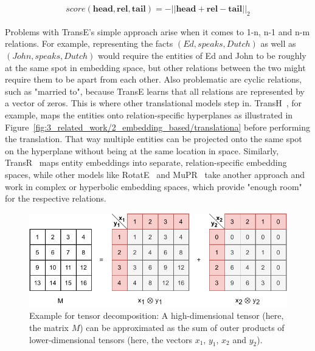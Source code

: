 \begin{align}
    score(\textbf{head}, \textbf{rel}, \textbf{tail}) = {- || \textbf{head} + \textbf{rel} - \textbf{tail} ||}_{2}
    \label{eq:3_related_work/2_embedding_based/trans_e}
\end{align}

Problems with TransE's simple approach arise when it comes to 1-n, n-1 and n-m relations. For example, representing the facts $(Ed, speaks, Dutch)$ as well as $(John, speaks, Dutch)$ would require the entities of Ed and John to be roughly at the same spot in embedding space, but other relations between the two might require them to be apart from each other. Also problematic are cyclic relations, such as "married to", because TransE learns that all relations are represented by a vector of zeros. This is where other translational models step in. TransH~\cite{Wang2014KnowledgeGE}, for example, maps the entities onto relation-specific hyperplanes as illustrated in Figure~\ref{fig:3_related_work/2_embedding_based/translationa} before performing the translation. That way multiple entities can be projected onto the same spot on the hyperplane without being at the same location in space. Similarly, TransR~\cite{Lin2015LearningEA} maps entity embeddings into separate, relation-specific embedding spaces, while other models like RotatE~\cite{Sun2019RotatEKG} and MuPR~\cite{Balazevic2019MultirelationalPG} take another approach and work in complex or hyperbolic embedding spaces, which provide "enough room" for the respective relations.

\begin{figure}[t]
    \centering
    \includegraphics{3_related_work/2_embedding_based/tensor_decomposition}
    \caption{Example for tensor decomposition: A high-dimensional tensor (here, the matrix $M$) can be approximated as the sum of outer products of lower-dimensional tensors (here, the vectors $x_1$, $y_1$, $x_2$ and $y_2$).}
    \label{fig:3_related_work/2_embedding_based/tensor_decomposition}
\end{figure}

